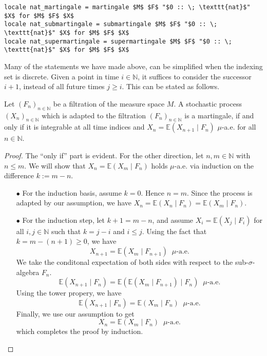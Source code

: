 \begin{isadefinition}
{\small
\begin{lstlisting}[style=isabelle]
locale nat_martingale = martingale $M$ $F$ "$0 :: \; \texttt{nat}$" $X$ for $M$ $F$ $X$
locale nat_submartingale = submartingale $M$ $F$ "$0 :: \; \texttt{nat}$" $X$ for $M$ $F$ $X$
locale nat_supermartingale = supermartingale $M$ $F$ "$0 :: \; \texttt{nat}$" $X$ for $M$ $F$ $X$
\end{lstlisting}
}
\end{isadefinition}

Many of the statements we have made above, can be simplified when the indexing set is discrete. Given a point in time $i \in \mathbb{N}$, it suffices to consider the successor $i + 1$, instead of all future times $j \ge i$. This can be stated as follows.

\begin{lemma}
	Let $(F_n)_{n \in \mathbb{N}}$ be a filtration of the measure space $M$. A stochastic process $(X_n)_{n \in \mathbb{N}}$ which is adapted to the filtration $(F_n)_{n \in \mathbb{N}}$ is a martingale, if and only if it is integrable at all time indices and $X_n = \mathbb{E}(X_{n + 1} \;\vert\; F_n)$ $\mu$-a.e. for all $n \in \mathbb{N}$.
\end{lemma}
\begin{proof}
	The ``only if'' part is evident. For the other direction, let $n, m \in \mathbb{N}$ with $n \le m$. We will show that $X_n = \mathbb{E}(X_m \;\vert\; F_n)$ holds $\mu$-a.e. via induction on the difference $k := m - n$. 
	\begin{enumerate}
	\item[$\bullet$] For the induction basis, assume $k = 0$. Hence $n = m$. Since the process is adapted by our assumption, we have $X_n = \mathbb{E}(X_n \;\vert\; F_n) = \mathbb{E}(X_m \;\vert\; F_n)$.
	
	\item[$\bullet$] For the induction step, let $k + 1 = m - n$, and assume $X_i = \mathbb{E}(X_j \;\vert\; F_i)$ for all $i, j \in \mathbb{N}$ such that $k = j - i$ and $i \le j$. Using the fact that $k = m - (n + 1) \ge 0$, we have
	\[
		X_{n + 1} = \mathbb{E}(X_m \;\vert\; F_{n + 1}) \;\;\mu\textrm{-a.e.}
	\]
	We take the conditonal expectation of both sides with respect to the sub-$\sigma$-algebra $F_n$.
	\[
		\mathbb{E}(X_{n + 1} \;\vert\; F_n) =  \mathbb{E}(\mathbb{E}(X_m \;\vert\; F_{n + 1}) \;\vert\; F_n) \;\;\mu\textrm{-a.e.}
	\]
	Using the tower propery, we have
	\[
		\mathbb{E}(X_{n + 1} \;\vert\; F_n) =  \mathbb{E}(X_m \;\vert\; F_n) \;\;\mu\textrm{-a.e.}
	\]
	Finally, we use our assumption to get
	\[
		X_n =  \mathbb{E}(X_m \;\vert\; F_n) \;\;\mu\textrm{-a.e.}
	\]	
	which completes the proof by induction.
	\end{enumerate}
\end{proof}

